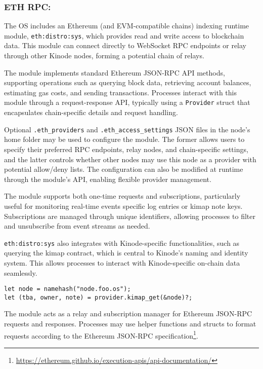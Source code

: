 \documentclass[runningheads]{llncs}
\begin{document}
\subsubsection{ETH RPC:}
\label{sec:oseth}
The OS includes an Ethereum (and EVM-compatible chains) indexing runtime module, \verb|eth:distro:sys|, which provides read and write access to blockchain data. This module can connect directly to WebSocket RPC endpoints or relay through other Kinode nodes, forming a potential chain of relays.

The module implements standard Ethereum JSON-RPC API methods, supporting operations such as querying block data, retrieving account balances, estimating gas costs, and sending transactions. Processes interact with this module through a request-response API, typically using a \verb|Provider| struct that encapsulates chain-specific details and request handling.

Optional \verb|.eth_providers| and \verb|.eth_access_settings| JSON files in the node's home folder may be used to configure the module. The former allows users to specify their preferred RPC endpoints, relay nodes, and chain-specific settings, and the latter controls whether other nodes may use this node as a provider with potential allow/deny lists. The configuration can also be modified at runtime through the module's API, enabling flexible provider management.

The module supports both one-time requests and subscriptions, particularly useful for monitoring real-time events specific log entries or kimap note keys. Subscriptions are managed through unique identifiers, allowing processes to filter and unsubscribe from event streams as needed.

\verb|eth:distro:sys| also integrates with Kinode-specific functionalities, such as querying the kimap contract, which is central to Kinode's naming and identity system. This allows processes to interact with Kinode-specific on-chain data seamlessly.

\begin{verbatim}
let node = namehash("node.foo.os");
let (tba, owner, note) = provider.kimap_get(&node)?;
\end{verbatim}

The module acts as a relay and subscription manager for Ethereum JSON-RPC requests and responses. Processes may use helper functions and structs to format requests according to the Ethereum JSON-RPC specification\footnote{\url{https://ethereum.github.io/execution-apis/api-documentation/}}.
\end{document}
